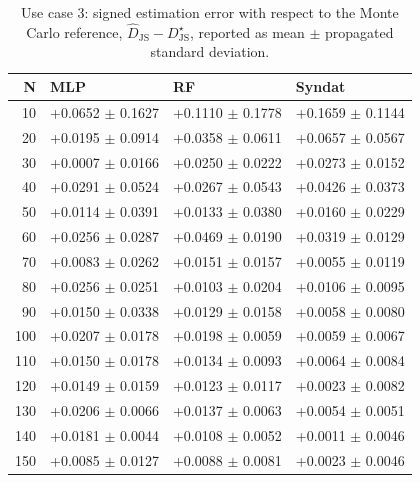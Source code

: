 \begin{table}
\caption{Use case 3: signed estimation error with respect to the Monte Carlo reference, $\widehat{D}_{\mathrm{JS}} - D_{\mathrm{JS}}^{\star}$, reported as mean $\pm$ propagated standard deviation.}
\label{tab:uc3_error_vs_gt}
\begin{tabular}{rlll}
\toprule
N & MLP & RF & Syndat \\
\midrule
10 & +0.0652 $\pm$ 0.1627 & +0.1110 $\pm$ 0.1778 & +0.1659 $\pm$ 0.1144 \\
20 & +0.0195 $\pm$ 0.0914 & +0.0358 $\pm$ 0.0611 & +0.0657 $\pm$ 0.0567 \\
30 & +0.0007 $\pm$ 0.0166 & +0.0250 $\pm$ 0.0222 & +0.0273 $\pm$ 0.0152 \\
40 & +0.0291 $\pm$ 0.0524 & +0.0267 $\pm$ 0.0543 & +0.0426 $\pm$ 0.0373 \\
50 & +0.0114 $\pm$ 0.0391 & +0.0133 $\pm$ 0.0380 & +0.0160 $\pm$ 0.0229 \\
60 & +0.0256 $\pm$ 0.0287 & +0.0469 $\pm$ 0.0190 & +0.0319 $\pm$ 0.0129 \\
70 & +0.0083 $\pm$ 0.0262 & +0.0151 $\pm$ 0.0157 & +0.0055 $\pm$ 0.0119 \\
80 & +0.0256 $\pm$ 0.0251 & +0.0103 $\pm$ 0.0204 & +0.0106 $\pm$ 0.0095 \\
90 & +0.0150 $\pm$ 0.0338 & +0.0129 $\pm$ 0.0158 & +0.0058 $\pm$ 0.0080 \\
100 & +0.0207 $\pm$ 0.0178 & +0.0198 $\pm$ 0.0059 & +0.0059 $\pm$ 0.0067 \\
110 & +0.0150 $\pm$ 0.0178 & +0.0134 $\pm$ 0.0093 & +0.0064 $\pm$ 0.0084 \\
120 & +0.0149 $\pm$ 0.0159 & +0.0123 $\pm$ 0.0117 & +0.0023 $\pm$ 0.0082 \\
130 & +0.0206 $\pm$ 0.0066 & +0.0137 $\pm$ 0.0063 & +0.0054 $\pm$ 0.0051 \\
140 & +0.0181 $\pm$ 0.0044 & +0.0108 $\pm$ 0.0052 & +0.0011 $\pm$ 0.0046 \\
150 & +0.0085 $\pm$ 0.0127 & +0.0088 $\pm$ 0.0081 & +0.0023 $\pm$ 0.0046 \\
\bottomrule
\end{tabular}
\end{table}
